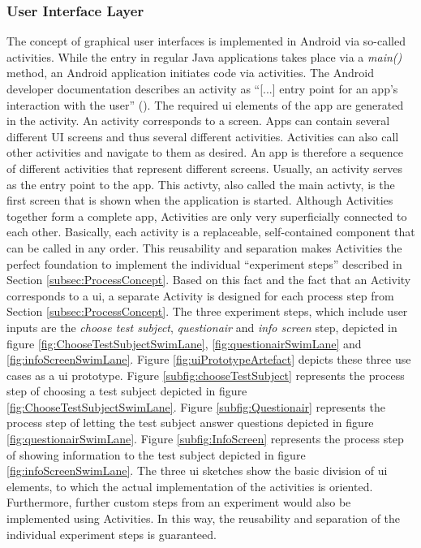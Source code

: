 \subsubsection{User Interface Layer}

The concept of graphical user interfaces is implemented in Android via so-called activities. While the entry in regular Java applications takes place via a \textit{main()} method, an Android application initiates code via activities. The Android developer documentation describes an activity as \enquote{[...] entry point for an app's interaction with the user} (\cite{Google.2023}). The required \ac{ui} elements of the app are generated in the activity. An activity corresponds to a screen. Apps can contain several different UI screens and thus several different activities. Activities can also call other activities and navigate to them as desired. An app is therefore a sequence of different activities that represent different screens. Usually, an activity serves as the entry point to the app. This activty, also called the main activty, is the first screen that is shown when the application is started. Although Activities together form a complete app, Activities are only very superficially connected to each other. Basically, each activity is a replaceable, self-contained component that can be called in any order. This reusability and separation makes Activities the perfect foundation to implement the individual \enquote{experiment steps} described in Section \ref{subsec:ProcessConcept}. Based on this fact and the fact that an Activity corresponds to a \ac{ui}, a separate Activity is designed for each process step from Section \ref{subsec:ProcessConcept}. The three experiment steps, which include user inputs are the \textit{choose test subject}, \textit{questionair} and \textit{info screen} step, depicted in figure \ref{fig:ChooseTestSubjectSwimLane}, \ref{fig:questionairSwimLane} and \ref{fig:infoScreenSwimLane}. Figure \ref{fig:uiPrototypeArtefact} depicts these three use cases as a \ac{ui} prototype. Figure \ref{subfig:chooseTestSubject} represents the process step of choosing a test subject depicted in figure \ref{fig:ChooseTestSubjectSwimLane}. Figure \ref{subfig:Questionair} represents the process step of letting the test subject answer questions depicted in figure \ref{fig:questionairSwimLane}. Figure \ref{subfig:InfoScreen}  represents the process step of showing information to the test subject depicted in figure \ref{fig:infoScreenSwimLane}. The three \ac{ui} sketches show the basic division of \ac{ui} elements, to which the actual implementation of the activities is oriented. Furthermore, further custom steps from an experiment would also be implemented using Activities. In this way, the reusability and separation of the individual experiment steps is guaranteed.


